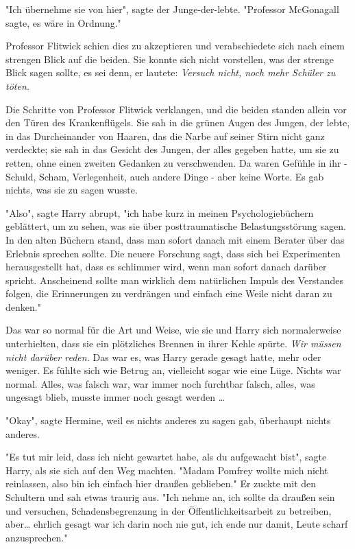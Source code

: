 {"Ich übernehme sie von hier", sagte der Junge-der-lebte. "Professor McGonagall sagte, es wäre in Ordnung."

Professor Flitwick schien dies zu akzeptieren und verabschiedete sich nach einem strengen Blick auf die beiden. Sie konnte sich nicht vorstellen, was der strenge Blick sagen sollte, es sei denn, er lautete: \emph{Versuch nicht, noch mehr Schüler zu töten.}

Die Schritte von Professor Flitwick verklangen, und die beiden standen allein vor den Türen des Krankenflügels. Sie sah in die grünen Augen des Jungen, der lebte, in das Durcheinander von Haaren, das die Narbe auf seiner Stirn nicht ganz verdeckte; sie sah in das Gesicht des Jungen, der alles gegeben hatte, um sie zu retten, ohne einen zweiten Gedanken zu verschwenden. Da waren Gefühle in ihr - Schuld, Scham, Verlegenheit, auch andere Dinge - aber keine Worte. Es gab nichts, was sie zu sagen wusste.

"Also", sagte Harry abrupt, "ich habe kurz in meinen Psychologiebüchern geblättert, um zu sehen, was sie über posttraumatische Belastungsstörung sagen. In den alten Büchern stand, dass man sofort danach mit einem Berater über das Erlebnis sprechen sollte. Die neuere Forschung sagt, dass sich bei Experimenten herausgestellt hat, dass es schlimmer wird, wenn man sofort danach darüber spricht. Anscheinend sollte man wirklich dem natürlichen Impuls des Verstandes folgen, die Erinnerungen zu verdrängen und einfach eine Weile nicht daran zu denken."

Das war so normal für die Art und Weise, wie sie und Harry sich normalerweise unterhielten, dass sie ein plötzliches Brennen in ihrer Kehle spürte. \emph{Wir müssen nicht darüber reden.} Das war es, was Harry gerade gesagt hatte, mehr oder weniger. Es fühlte sich wie Betrug an, vielleicht sogar wie eine Lüge. Nichts war normal. Alles, was falsch war, war immer noch furchtbar falsch, alles, was ungesagt blieb, musste immer noch gesagt werden …

"Okay", sagte Hermine, weil es nichts anderes zu sagen gab, überhaupt nichts anderes.

"Es tut mir leid, dass ich nicht gewartet habe, als du aufgewacht bist", sagte Harry, als sie sich auf den Weg machten. "Madam Pomfrey wollte mich nicht reinlassen, also bin ich einfach hier draußen geblieben." Er zuckte mit den Schultern und sah etwas traurig aus. "Ich nehme an, ich sollte da draußen sein und versuchen, Schadensbegrenzung in der Öffentlichkeitsarbeit zu betreiben, aber… ehrlich gesagt war ich darin noch nie gut, ich ende nur damit, Leute scharf anzusprechen."

}
